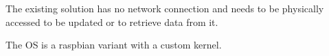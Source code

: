 \documentclass[../../main.tex]{subfiles}
\begin{document}
The existing solution has no network connection and needs to be physically accessed to be
updated or to retrieve data from it.

The OS is a raspbian variant with a custom kernel.
\end{document}

